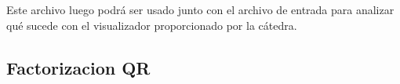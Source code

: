 Este archivo luego podrá ser usado junto con el archivo de entrada para analizar qué sucede con el visualizador proporcionado por la cátedra.


\subsection{Factorizacion QR}










